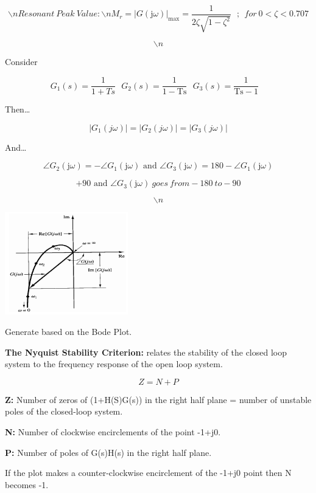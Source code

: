\documentclass[a0,landscape]{article}
\begin{document}
\begin{multicols}{3}
\[\backslash n{Resonant\ Peak\ Value:\backslash n}{M_{r} = \left| G\left( \text{j}\omega \right) \right|_{\max} = \frac{1}{2\zeta\sqrt{1 - \zeta^{2}}}\ \ \ ;\ \ for\ 0 < \zeta < 0.707}\]

\[\backslash n\]

Consider

\[G_{1}\left( s \right) = \frac{1}{1 + Ts}\text{\ \ \ \ }G_{2}\left( s \right) = \frac{1}{1 - \text{Ts}}\text{\ \ \ \ }G_{3}\left( s \right) = \frac{1}{\text{Ts} - 1}\text{\ \ \ }\ \]

Then\ldots{}

\[\left| G_{1}(j\omega) \right| = \left| G_{2}(j\omega) \right| = \left| G_{3}(j\omega) \right|\]

And\ldots{}

\[\angle G_{2}\left( \text{j}\omega \right) = - \angle G_{1}\left( \text{j} \omega \right)\text{\ \ \ \ \ \ \ and\ \ \ \ \ \ \ }\angle G_{3}\left( \text{j} \omega \right) = 180 - \angle G_{1}\left( \text{j}\omega \right)\]

\[+ 90\text{\ and\ }\angle G_{3}\left( \text{j}\omega \right)\ goes\ from - 180\ to - 90\]

\[\backslash n\]

\includegraphics[width=2.10641in,height=1.75200in]{media/image25.png}

Generate based on the Bode Plot.

\textbf{The Nyquist Stability Criterion:} relates the stability of the
closed loop system to the frequency response of the open loop system.

\[Z = N + P\]

\textbf{Z:} Number of zeros of (1+H(S)G(s)) in the right half plane =
number of unstable poles of the closed-loop system.

\textbf{N:} Number of clockwise encirclements of the point -1+j0.

\textbf{P:} Number of poles of G(s)H(s) in the right half plane.

If the plot makes a counter-clockwise encirclement of the -1+j0 point
then N becomes -1.


\end{multicols}
\end{document}

